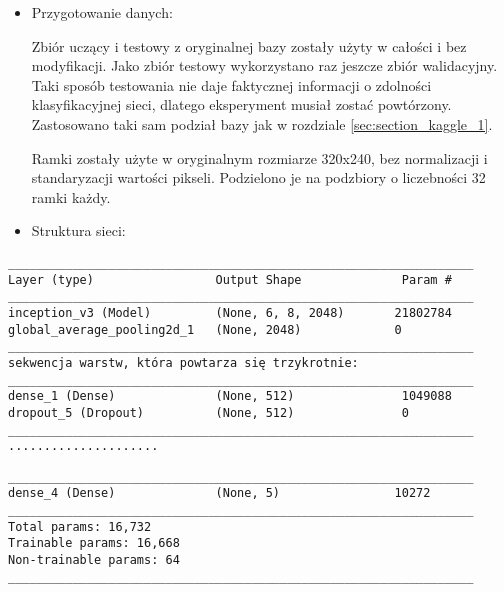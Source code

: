 {\parindent0pt %
\begin{itemize}
\item Przygotowanie danych:

Zbiór uczący i testowy z oryginalnej bazy zostały użyty w całości i bez modyfikacji. Jako zbiór testowy wykorzystano raz jeszcze zbiór walidacyjny. Taki sposób testowania nie daje faktycznej informacji o zdolności klasyfikacyjnej sieci, dlatego eksperyment musiał zostać powtórzony. Zastosowano taki sam podział bazy jak w rozdziale \ref{sec:section_kaggle_1}.

Ramki zostały użyte w oryginalnym rozmiarze 320x240, bez normalizacji i standaryzacji wartości pikseli. Podzielono je na podzbiory o liczebności 32 ramki każdy.
\item Struktura sieci:
\end{itemize}

\newsavebox\myvfff
\begin{lrbox}{\myvfff}
\setlength{\myminipagewidth}{0.9\linewidth} %
\setlength{\myminipagecentering}{(\linewidth-\myminipagewidth)/2}
\noindent\hspace{\myminipagecentering}\begin{minipage}{\myminipagewidth}
\begin{verbatim}
_________________________________________________________________
Layer (type)                 Output Shape              Param #   
_________________________________________________________________
inception_v3 (Model)         (None, 6, 8, 2048)       21802784  
global_average_pooling2d_1   (None, 2048)             0           
_________________________________________________________________
sekwencja warstw, która powtarza się trzykrotnie:
_________________________________________________________________
dense_1 (Dense)              (None, 512)               1049088     
dropout_5 (Dropout)          (None, 512)               0        
_________________________________________________________________
.....................

\end{verbatim} 
\end{minipage}\end{lrbox}
\resizebox{0.75\textwidth}{!}{\usebox\myvfff}

\newsavebox\myvff
\begin{lrbox}{\myvff}
\setlength{\myminipagewidth}{0.9\linewidth} %
\setlength{\myminipagecentering}{(\linewidth-\myminipagewidth)/2}
\noindent\hspace{\myminipagecentering}\begin{minipage}{\myminipagewidth}
\begin{verbatim}
_________________________________________________________________
dense_4 (Dense)              (None, 5)                10272     
_________________________________________________________________
Total params: 16,732
Trainable params: 16,668
Non-trainable params: 64
_________________________________________________________________
\end{verbatim} 
\end{minipage}\end{lrbox}
\resizebox{0.75\textwidth}{!}{\usebox\myvff}

}
